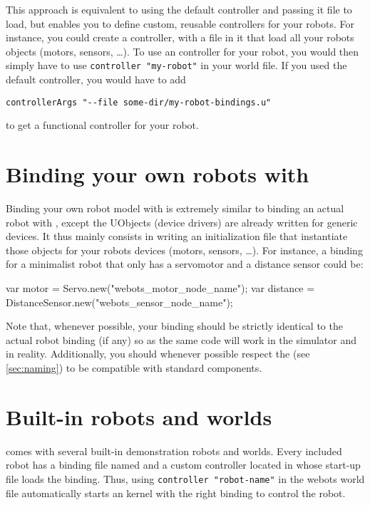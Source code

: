 This approach is equivalent to using the default 
controller and passing it file to load, but enables you to define
custom, reusable controllers for your robots. For instance, you could
create a  controller, with a
 file in it that load all your robots objects (motors,
sensors, \ldots). To use an \urbi controller for your robot, you would
then simply have to use \lstinline+controller "my-robot"+ in your
world file. If you used the default  controller, you
would have to add

\lstinline+controllerArgs "--file some-dir/my-robot-bindings.u"+

\noindent
to get a functional controller for your robot.

\section{Binding your own robots with \uwebots}

Binding your own robot model with \uwebots is extremely similar to
binding an actual robot with \urbi, except the UObjects (device
drivers) are already written for \webots generic devices. It thus
mainly consists in writing an initialization \us file that instantiate
those \urbi objects for your robots devices (motors, sensors,
\ldots). For instance, a binding for a minimalist robot that only has
a servomotor and a distance sensor could be:

\begin{urbiunchecked}
var motor = Servo.new("webots_motor_node_name");
var distance = DistanceSensor.new("webots_sensor_node_name");
\end{urbiunchecked}

Note that, whenever possible, your \webots binding should be strictly
identical to the actual robot binding (if any) so as the same \urbi
code will work in the simulator and in reality. Additionally, you
should whenever possible respect the \gsrapi (see
\autoref{sec:naming}) to be compatible with standard \urbi components.

\section{Built-in robots and worlds}

\uwebots comes with several built-in demonstration robots and
worlds. Every included robot has a binding file named
 and a
custom controller located in
 whose 
start-up file loads the binding. Thus, using \lstinline+controller "robot-name"+
in the webots world file automatically starts an \urbi
kernel with the right binding to control the robot.

